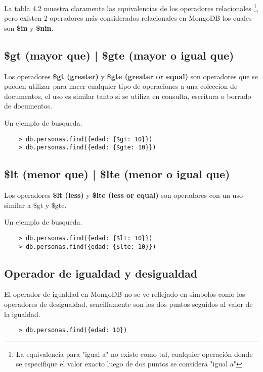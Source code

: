 La tabla 4.2 muestra claramente las equivalencias de los operadores relacionales \footnote{La equivalencia para "igual a" no existe como tal, cualquier operación donde se especifique el valor exacto luego de dos puntos se considera "igual a"}, pero existen 2 operadores más considerados relacionales en MongoDB los cuales son \textbf{\$in} y \textbf{\$nin}.

\subsection{\$gt (mayor que) | \$gte (mayor o igual que)}

Los operadores \textbf{\$gt (greater)} y \textbf{\$gte (greater or equal)} son operadores que se pueden utilizar para hacer cualquier tipo de operaciones a una coleccion de documentos, el uso es similar tanto si se utiliza en consulta, escritura o borrado de documentos. 

Un ejemplo de busqueda.

\begin{lstlisting}
    > db.personas.find({edad: {$gt: 10}})
    > db.personas.find({edad: {$gte: 10}})
\end{lstlisting}

\subsection{\$lt (menor que) | \$lte (menor o igual que)}

Los operadores \textbf{\$lt (less)} y \textbf{\$lte (less or equal)} son operadores con un uso similar a \$gt y \$gte. 

Un ejemplo de busqueda.

\begin{lstlisting}
    > db.personas.find({edad: {$lt: 10}})
    > db.personas.find({edad: {$lte: 10}})
\end{lstlisting}

\subsection{Operador de igualdad y desigualdad}

El operador de igualdad en MongoDB no se ve reflejado en simbolos como los operadores de desigualdad, sencillamente son los dos puntos seguidos al valor de la igualdad.

\begin{lstlisting}
    > db.personas.find({edad: 10})
\end{lstlisting}

